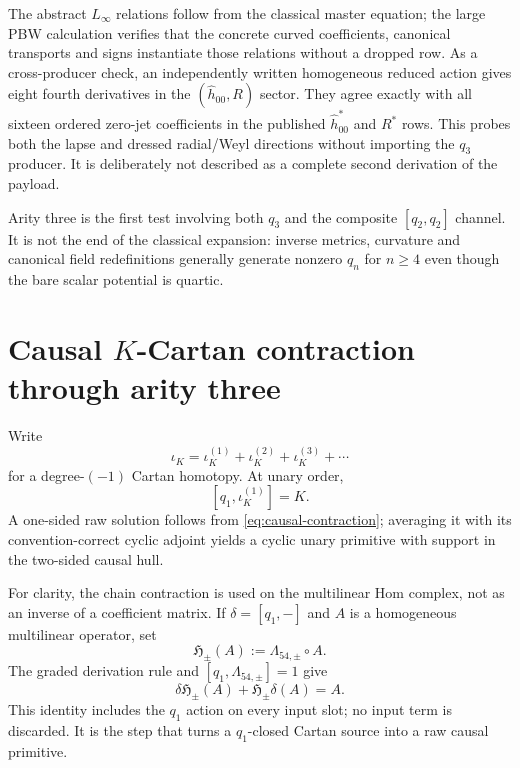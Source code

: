 \documentclass[11pt]{article}
\theoremstyle{definition}
\theoremstyle{remark}
\begin{document}
The abstract $L_\infty$ relations follow from the classical master equation;
the large PBW calculation verifies that the concrete curved coefficients,
canonical transports and signs instantiate those relations without a dropped
row.  As a cross-producer check, an independently written homogeneous reduced
action gives eight fourth derivatives in the
$(\widehat h_{00},R)$ sector.  They agree exactly with all sixteen ordered
zero-jet coefficients in the published $\widehat h^*_{00}$ and $R^*$ rows.
This probes both the lapse and dressed radial/Weyl directions without
importing the $q_3$ producer.  It is deliberately not described as a complete
second derivation of the payload.

Arity three is the first test involving both $q_3$ and the composite
$[q_2,q_2]$ channel.  It is not the end of the classical expansion: inverse
metrics, curvature and canonical field redefinitions generally generate
nonzero $q_n$ for $n\ge4$ even though the bare scalar potential is quartic.

\section{Causal \texorpdfstring{$K$}{K}-Cartan contraction through arity
three}\label{sec:Cartan}

Write
\begin{equation}\label{eq:iota-expansion}
 \iota_K=\iota_K^{(1)}+\iota_K^{(2)}+\iota_K^{(3)}+\cdots
\end{equation}
for a degree-$(-1)$ Cartan homotopy.  At unary order,
\begin{equation}\label{eq:Cartan1}
 [q_1,\iota_K^{(1)}]=K.
\end{equation}
A one-sided raw solution follows from \eqref{eq:causal-contraction}; averaging
it with its convention-correct cyclic adjoint yields a cyclic unary
primitive with support in the two-sided causal hull.

For clarity, the chain contraction is used on the multilinear Hom complex,
not as an inverse of a coefficient matrix.  If
$\delta=[q_1,-]$ and $A$ is a homogeneous multilinear operator, set
\begin{equation}\label{eq:Hom-contraction}
 \mathfrak H_\pm(A):=\Lambda_{54,\pm}\circ A.
\end{equation}
The graded derivation rule and $[q_1,\Lambda_{54,\pm}]=1$ give
\begin{equation}
 \delta\mathfrak H_\pm(A)+\mathfrak H_\pm\delta(A)=A.
\end{equation}
This identity includes the $q_1$ action on every input slot; no input term is
discarded.  It is the step that turns a $q_1$-closed Cartan source into a raw
causal primitive.
\end{document}
